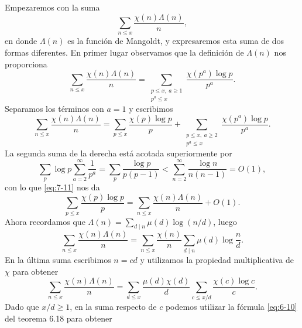 \documentclass[12pt,a4paper]{book}
\begin{document}
    Empezaremos con la suma
    \begin{equation*}
        \sum_{n\leq x}\frac{\chi(n)\Lambda(n)}{n},
    \end{equation*}
    en donde $\Lambda(n)$ es la función de Mangoldt, y expresaremos esta suma de dos formas
    diferentes. En primer lugar observamos que la definición de $\Lambda(n)$ nos
    proporciona
    \begin{equation*}
        \sum_{n\leq x}\frac{\chi(n)\Lambda(n)}{n}=\sum_{\substack{p\leq x,\ a\geq1\\p^{a}\leq x}}
        \frac{\chi(p^{a})\log p}{p^{a}}.
    \end{equation*}
    Separamos los términos con $a=1$ y escribimos
    \begin{equation}\label{eq:7-11}
        \sum_{n\leq x}\frac{\chi(n)\Lambda(n)}{n}=\sum_{p\leq x}\frac{\chi(p)\log p}{p}
        +\sum_{\substack{p\leq x,\ a\geq2\\p^{a}\leq x}}\frac{\chi(p^{a})\log p}{p^{a}}.
    \end{equation}
    La segunda suma de la derecha está acotada superiormente por
    \begin{equation*}
        \sum_{p}\log p\sum_{a=2}^{\infty}\frac{1}{p^{a}}=\sum_{p}\frac{\log p}{p(p-1)}
        <\sum_{n=2}^{\infty}\frac{\log n}{n(n-1)}=O(1),
    \end{equation*}
    con lo que \eqref{eq:7-11} nos da
    \begin{equation}\label{eq:7-12}
        \sum_{p\leq x}\frac{\chi(p)\log p}{p}=\sum_{n\leq x}\frac{\chi(n)\Lambda(n)}{n}+O(1).
    \end{equation}
    Ahora recordamos que $\Lambda(n)=\sum_{d\mid n}\mu(d)\log(n/d)$, luego
    \begin{equation*}
        \sum_{n\leq x}\frac{\chi(n)\Lambda(n)}{n}=\sum_{n\leq x}\frac{\chi(n)}{n}
        \sum_{d\mid n}\mu(d)\log\frac{n}{d}.
    \end{equation*}
    En la última suma escribimos $n=cd$ y utilizamos la propiedad multiplicativa de $\chi$
    para obtener
    \begin{equation}\label{eq:7-13}
        \sum_{n\leq x}\frac{\chi(n)\Lambda(n)}{n}=\sum_{d\leq x}\frac{\mu(d)\chi(d)}{d}
        \sum_{c\leq x/d}\frac{\chi(c)\log c}{c}.
    \end{equation}
    Dado que $x/d\geq1$, en la suma respecto de $c$ podemos utilizar la fórmula
    \eqref{eq:6-10} del teorema 6.18 para obtener
\end{document}
